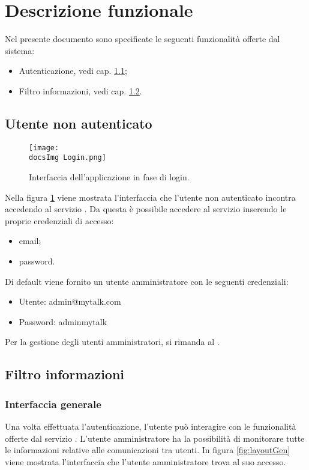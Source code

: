\section{Descrizione funzionale}\label{desFunz}{
{
Nel presente documento sono specificate le seguenti funzionalità offerte dal sistema:
\begin{itemize}
	\item Autenticazione, vedi cap. \ref{utNoAutent};
	\item Filtro informazioni, vedi cap. \ref{infGest}.
\end{itemize}
}

\subsection{Utente non autenticato}\label{utNoAutent}{

\begin{figure}[h!]
	\centering
		\texttt{[image: \\docsImg Login.png]}
		\caption{Interfaccia dell'applicazione in fase di login.}
		\label{fig:imgLogin} 
	\end{figure} 
	
Nella figura \ref{fig:imgLogin} viene mostrata l'interfaccia che l'utente non autenticato incontra accedendo al servizio \textbf{\mytalk}. Da questa è possibile accedere al servizio inserendo le proprie credenziali di accesso:
\begin{itemize}
	\item email;
	\item password.
\end{itemize}
	
Di default viene fornito un utente amministratore con le seguenti credenziali:
\begin{itemize}
	\item Utente: admin@mytalk.com
	\item Password: adminmytalk
\end{itemize}
Per la gestione degli utenti amministratori, si rimanda al \textit{\ManualeInstallatore}.
}


\subsection{Filtro informazioni}\label{infGest}{
\subsubsection{Interfaccia generale}{
Una volta effettuata l'autenticazione, l'utente può interagire con le funzionalità offerte dal servizio \textbf{\mytalk}.
L'utente amministratore ha la possibilità di monitorare tutte le informazioni relative alle comunicazioni tra utenti.
In figura \ref{fig:layoutGen} viene mostrata l'interfaccia che l'utente amministratore trova al suo accesso.


}}}
